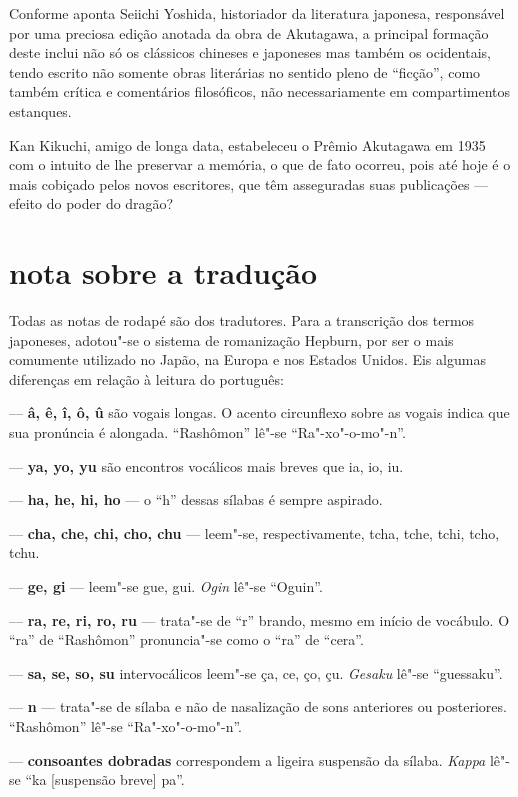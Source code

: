 Conforme aponta Seiichi Yoshida, historiador da literatura
japonesa, responsável por uma preciosa edição anotada da obra de Akutagawa, a
principal formação deste inclui não só os clássicos chineses e
japoneses mas também os ocidentais, tendo escrito não somente obras
literárias no sentido pleno de ``ficção'', como também crítica e
comentários filosóficos, não necessariamente em compartimentos estanques.

Kan Kikuchi, amigo de longa data, estabeleceu o Prêmio Akutagawa em
1935 com o intuito de lhe preservar a memória, o que de fato ocorreu,
pois até hoje é o mais cobiçado pelos novos escritores, que têm
asseguradas suas publicações --- efeito do poder do dragão?

\section*{nota sobre a tradução}

Todas as notas de rodapé são dos tradutores.		%
Para a transcrição dos termos japoneses, adotou"-se o sistema de
romanização Hepburn, por ser o mais comumente utilizado no Japão, na
Europa e nos Estados Unidos. Eis algumas diferenças em relação à
leitura do português:

--- \textbf{â, ê, î, ô, û} são vogais longas. O acento circunflexo sobre as vogais
indica que sua pronúncia é alongada. ``Rashômon'' lê"-se ``Ra"-xo"-o-mo"-n''.

--- \textbf{ya, yo, yu} são encontros vocálicos mais breves que ia, io, iu.

--- \textbf{ha, he, hi, ho} --- o ``h'' dessas sílabas é sempre aspirado.

--- \textbf{cha, che, chi, cho, chu} --- leem"-se, respectivamente, tcha, tche, tchi,
tcho, tchu.

--- \textbf{ge, gi} --- leem"-se gue, gui. \textit{Ogin} lê"-se ``Oguin''.

--- \textbf{ra, re, ri, ro, ru} --- trata"-se de ``r'' brando, mesmo em início
de vocábulo. O ``ra'' de ``Rashômon'' pronuncia"-se como o ``ra'' de ``cera''.

--- \textbf{sa, se, so, su} intervocálicos leem"-se ça, ce, ço, çu. 
\textit{Gesaku} lê"-se ``guessaku''.

--- \textbf{n} --- trata"-se de sílaba e não de nasalização de sons anteriores ou
posteriores. ``Rashômon'' lê"-se ``Ra"-xo"-o-mo"-n''.

 --- \textbf{consoantes dobradas} correspondem a ligeira suspensão da sílaba. \textit{Kappa} lê"-se ``ka [suspensão breve] pa''.

